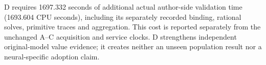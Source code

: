 D requires 1697.332 seconds of additional actual
author-side validation time (1693.604 CPU seconds),
including its separately recorded binding, rational solves, primitive traces
and aggregation. This cost is reported separately from the unchanged A--C
acquisition and service clocks. D strengthens independent original-model value
evidence; it creates neither an unseen population result nor a neural-specific
adoption claim.
